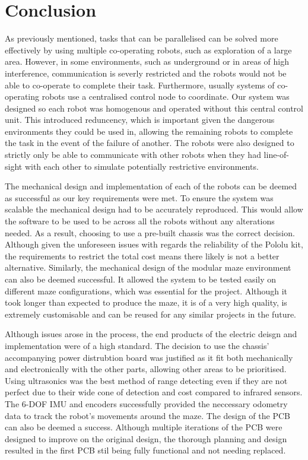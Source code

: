 
\chapter{Conclusion}\label{conclusion}

As previously mentioned, tasks that can be parallelised can be solved more 
effectively by using multiple co-operating robots, such as exploration of a large 
area. However, in some environments, such as underground or in areas of high 
interference, communication is severly restricted and the robots would not be able
to co-operate to complete their task. Furthermore, usually systems of co-operating robots 
use a centralised control node to coordinate. Our system was designed so each robot was 
homogenous and operated without this central control unit. This introduced reduncency, 
which is important given the dangerous environments they could be used in, allowing 
the remaining robots to complete the task in the event of the failure of another. 
The robots were also designed to strictly only be able to communicate with other robots 
when they had line-of-sight with each other to simulate potentially restrictive 
environments.  

The mechanical design and implementation of each of the robots can be deemed as 
successful as our key requirements were met. To ensure the system was  
scalable the mechanical design had to be accurately reproduced. This would allow the 
software to be used to be across all the robots without any alterations needed. As a 
result, choosing to use a pre-built chassis was the correct decision. Although given 
the unforeseen issues with regards the reliability of the Pololu kit, the 
requirements to restrict the total cost means there likely is not a better 
alternative. Similarly, the mechanical design of the modular maze environment can 
also be deemed successful. It allowed the system to be tested easily on
different maze configurations, which was essential for the project. Although it took 
longer than expected to produce the maze, it is of a very high quality, is extremely 
customisable and can be reused for any similar projects in the future.

Although issues arose in the process, the end products of the electric deisgn
and implementation were of a high standard. The decision to use the chassis'
accompanying power distrubtion board was justified as it fit both
mechanically and electronically with the other parts, allowing other areas to be 
prioritised. Using ultrasonics was the best method of range detecting even if
they are not perfect due to their wide cone of detection and
cost compared to infrared sensors. The 6-DOF IMU and encoders successfully
provided the neccessary odometry data to track the robot's movements around the
maze. The design of the PCB can also be deemed a success. Although multiple 
iterations of the PCB were designed to improve on the original design, the
thorough planning and design resulted in the first PCB stil being fully functional 
and not needing replaced. 

